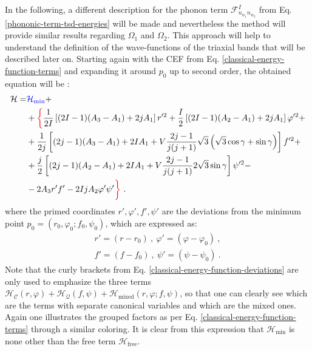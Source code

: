 In the following, a different description for the phonon term $\mathcal{F}_{n_{w_1}n_{w_2}}^I$ from Eq. \ref{phononic-term-tsd-energies} will be made and nevertheless the method will provide similar results regarding $\Omega_1$ and $\Omega_2$. This approach will help to understand the definition of the wave-functions of the triaxial bands that will be described later on. Starting again with the CEF from Eq. \ref{classical-energy-function-terms} and expanding it around $p_0$ up to second order, the obtained equation will be \cite{raduta2020approach}:
\begin{align}
    \mathcal{H}=&{\color{blue}\mathcal{H}_\text{min}}+\nonumber\\
                &+{\color{red}\bigg\{}\frac{1}{2I}\left[(2I-1)(A_3-A_1)+2jA_1\right]r'^{2}+\frac{I}{2}\left[(2I-1)(A_2-A_1)+2jA_1\right]\varphi'^2+\nonumber\\
                &+\frac{1}{2j}\left[(2j-1)(A_3-A_1)+2IA_1+V\frac{2j-1}{j(j+1)}\sqrt{3}\left(\sqrt{3}\cos\gamma+\sin\gamma\right)\right]f'^2+\nonumber\\
                &+\frac{j}{2}\left[(2j-1)(A_2-A_1)+2IA_1+V\frac{2j-1}{j(j+1)}2\sqrt{3}\sin\gamma\right]\psi'^2-\nonumber\\
                &-2A_3r'f'-2IjA_2\varphi'\psi'{\color{red}\bigg\}}\ .
    \label{classical-energy-function-deviations}
\end{align}
where the primed coordinates $r',\varphi',f',\psi'$ are the deviations from the minimum point $p_0=(r_0,\varphi_0;f_0,\psi_0)$, which are expressed as:
\begin{align}
    r'=(r-r_0)\ ,\ \varphi'=(\varphi-\varphi_0)\ ,\nonumber\\
    f'=(f-f_0)\ ,\ \psi'=(\psi-\psi_0)\ .
\end{align}
Note that the curly brackets from Eq. \ref{classical-energy-function-deviations} are only used to emphasize the three terms $\mathcal{H}_\mathscr{C}(r,\varphi)+\mathcal{H}_\mathcal{Q}(f,\psi)+\mathcal{H}_\text{mixed}(r,\varphi;f,\psi)$, so that one can clearly see which are the terms with separate canonical variables and which are the mixed ones. Again one illustrates the grouped factors as per Eq. \ref{classical-energy-function-terms} through a similar coloring. It is clear from this expression that $\mathcal{H}_\text{min}$ is none other than the free term $\mathcal{H}_\text{free}$.

